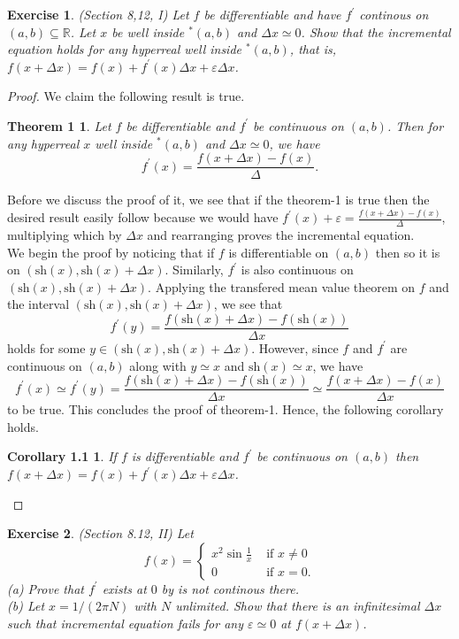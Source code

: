 \documentclass[a4paper, 11pt, openany]{book}
\theoremstyle{plain}
\newtheorem{exercise}{Exercise}[chapter]
\newtheorem*{theorem1}{Theorem 1}
\newtheorem*{corollary1.1}{Corollary 1.1}
\theoremstyle{plain}
\newcommand{\R}{\mathbb{R}}
\newcommand{\p}{\prime}
\newcommand{\ep}{\varepsilon}
\newcommand{\hyp}{{}^*}
\newcommand{\sh}{\text{sh}}
\newcommand{\Del}{\Delta}
\begin{document}
    \begin{exercise}
      (Section 8,12, I)
      Let $f$ be differentiable and have $f^\p$ continous on $(a,b) \subseteq \R$. Let $x$ be well inside $\hyp (a,b)$ and $\Del x \simeq 0$. Show that the incremental equation holds for any hyperreal well inside $\hyp (a,b)$, that is, $f(x+\Del x)=f(x)+f^\p(x) \Del x+\ep \Del x$.
    \end{exercise}
    \begin{proof}
      We claim the following result is true. 
      \begin{theorem1}
        Let $f$ be differentiable and $f^\p$ be continuous on $(a,b)$. Then for any hyperreal $x$ well inside $\hyp (a,b)$ and $\Del x \simeq 0$, we have $$f^\p(x)=\frac{f(x+\Del x)-f(x)}{\Del}.$$
      \end{theorem1}
      Before we discuss the proof of it, we see that if the theorem-1 is true then the desired result easily follow because we would have $f^\p(x)+\ep=\frac{f(x+\Del x)-f(x)}{\Del}$, multiplying which by $\Del x$ and rearranging proves the incremental equation. \\

      We begin the proof by noticing that if $f$ is differentiable on $(a,b)$ then so it is on $(\sh (x), \sh(x)+\Del x)$. Similarly, $f^\p$ is also continuous on $(\sh (x), \sh(x)+\Del x)$. Applying the transfered mean value theorem on $f$ and the interval $(\sh (x), \sh(x)+\Del x)$, we see that $$f^\p(y)=\frac{f(\sh(x)+\Del x)-f(\sh(x))}{\Del x}$$ holds for some $y \in (\sh (x), \sh(x)+\Del x)$. However, since $f$ and $f^\p$ are continuous on $(a,b)$ along with $y \simeq x$ and $\sh(x) \simeq x$, we have 
      $$f^\p(x) \simeq f^\p(y)= \frac{f(\sh(x)+\Del x)-f(\sh(x))}{\Del x} \simeq \frac{f(x+\Del x)-f(x)}{\Del x}$$ to be true. This concludes the proof of theorem-1. Hence, the following corollary holds. 
      \begin{corollary1.1}
        If $f$ is differentiable and $f^\p$ be continuous on $(a,b)$ then $f(x+\Del x)=f(x)+f^\p(x) \Del x+\ep \Del x$.
      \end{corollary1.1}
    \end{proof}

    \begin{exercise}
      (Section  8.12, II)
      Let $$f(x) = \begin{cases}
        x^2 \sin\frac{1}{x} & \text{ if } x \not =0 \\
        0 & \text{ if } x=0.
      \end{cases}$$
      (a) Prove that $f^\p$ exists at $0$ by is not continous there. \\
      (b) Let $x=1/(2\pi N)$ with $N$ unlimited. Show that there is an infinitesimal $\Del x$ such that incremental equation fails for any $\ep \simeq 0$ at $f(x+\Del x)$.
    \end{exercise}
\end{document}
